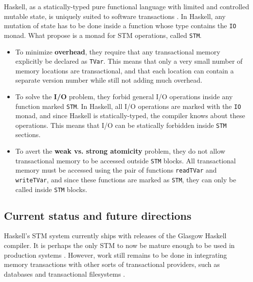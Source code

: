 \documentclass[a4paper]{acmtrans2m}
\begin{document}
Haskell, as a statically-typed pure functional language with limited and
controlled mutable state, is uniquely suited to software transactions
\cite{Harris:2005}. In Haskell, any mutation of state has to be done inside a
function whose type contains the \texttt{IO} monad. What 
propose is a monad for STM operations, called \texttt{STM}.

\begin{itemize}
\item To minimize \textbf{overhead}, they require that any transactional memory
  explicitly be declared as \texttt{TVar}. This means that only a very small
  number of memory locations are transactional, and that each location can contain
  a separate version number while still not adding much overhead.
\item To solve the \textbf{I/O} problem, they forbid general I/O operations inside
  any function marked \texttt{STM}. In Haskell, all I/O operations are marked with
  the \texttt{IO} monad, and since Haskell is statically-typed, the compiler knows
  about these operations. This means that I/O can be statically forbidden inside
  \texttt{STM} sections.
\item To avert the \textbf{weak vs. strong atomicity} problem, they do not allow
  transactional memory to be accessed outside \texttt{STM} blocks. All
  transactional memory must be accessed using the pair of functions
  \texttt{readTVar} and \texttt{writeTVar}, and since these functions are marked
  as \texttt{STM}, they can only be called inside \texttt{STM} blocks.
\end{itemize}

\subsection{Current status and future directions}

Haskell's STM system currently ships with releases of the Glasgow Haskell compiler.
It is perhaps the only STM to now be mature enough to be used in production systems
\cite{Stewart:2009}. However, work still remains to be done in integrating memory
transactions with other sorts of transactional providers, such as databases and
transactional filesystems \cite{SPJ:2006}.



\end{document}

